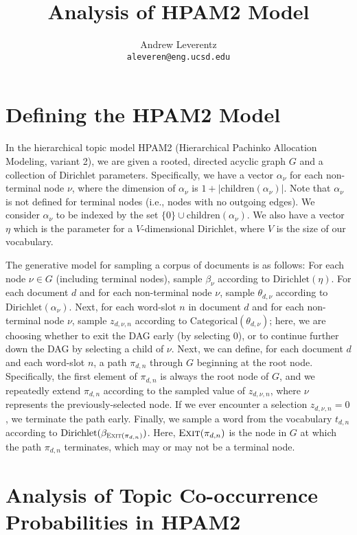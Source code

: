 \documentclass{article}
\title{Analysis of HPAM2 Model}
\author{
  Andrew Leverentz \\
  \texttt{aleveren@eng.ucsd.edu} \\
}
\date{}
\newcommand{\Exit}{\textsc{Exit}}
\begin{document}
\maketitle


\section{Defining the HPAM2 Model}

In the hierarchical topic model HPAM2 (Hierarchical Pachinko Allocation Modeling, variant 2), we are given a rooted, directed acyclic graph $G$ and a collection of Dirichlet parameters.
Specifically, we have a vector $\alpha_\nu$ for each non-terminal node $\nu$, where the dimension of $\alpha_\nu$ is $1 + |\text{children}(\alpha_\nu)|$.
Note that $\alpha_\nu$ is not defined for terminal nodes (i.e., nodes with no outgoing edges).
We consider $\alpha_\nu$ to be indexed by the set $\{0\} \cup \text{children}(\alpha_\nu)$.
We also have a vector $\eta$ which is the parameter for a $V$-dimensional Dirichlet, where $V$ is the size of our vocabulary.

The generative model for sampling a corpus of documents is as follows:
For each node $\nu \in G$ (including terminal nodes), sample $\beta_\nu$ according to $\text{Dirichlet}(\eta)$.
For each document $d$ and for each non-terminal node $\nu$, sample $\theta_{d,\nu}$ according to $\text{Dirichlet}(\alpha_\nu)$.
Next, for each word-slot $n$ in document $d$ and for each non-terminal node $\nu$, sample $z_{d,\nu,n}$ according to $\text{Categorical}(\theta_{d,\nu})$; here, we are choosing whether to exit the DAG early (by selecting $0$), or to continue further down the DAG by selecting a child of $\nu$.
Next, we can define, for each document $d$ and each word-slot $n$, a path $\pi_{d,n}$ through $G$ beginning at the root node.
Specifically, the first element of $\pi_{d,n}$ is always the root node of $G$, and we repeatedly extend $\pi_{d,n}$ according to the sampled value of $z_{d,\nu,n}$, where $\nu$ represents the previously-selected node.
If we ever encounter a selection $z_{d,\nu,n} = 0$, we terminate the path early.
Finally, we sample a word from the vocabulary $t_{d,n}$ according to $\text{Dirichlet}(\beta_{\Exit(\pi_{d,n})})$.
Here, $\Exit(\pi_{d,n})$ is the node in $G$ at which the path $\pi_{d,n}$ terminates, which may or may not be a terminal node.

\section{Analysis of Topic Co-occurrence Probabilities in HPAM2}
\end{document}
